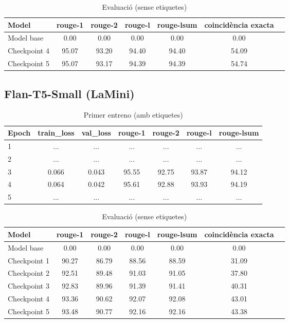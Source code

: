 \begin{table}[H]
    \caption{Evaluació (sense etiquetes)}
    \begin{tabular}{lcccccc}
    \toprule
    Model & rouge-1 & rouge-2 & rouge-l & rouge-lsum & coincidència exacta \\
    \midrule
    Model base & 0.00 & 0.00 & 0.00 & 0.00 & 0.00 \\
    Checkpoint 4 & 95.07 & 93.20 & 94.40 & 94.40 & 54.09 \\
    Checkpoint 5 & 95.07 & 93.17 & 94.39 & 94.39 & 54.74 \\
    \bottomrule
    \end{tabular}
\end{table}






\subsection{Flan-T5-Small (LaMini)}
\begin{table}[H]
    \caption{Primer entreno (amb etiquetes)}
    \begin{tabular}{lcccccc}
    \toprule
    Epoch & train\_loss & val\_loss & rouge-1 & rouge-2 & rouge-l & rouge-lsum \\
    \midrule
    1 & ... & ... & ... & ... & ... & ... \\
    2 & ... & ... & ... & ... & ... & ... \\
    3 & 0.066 & 0.043 & 95.55 & 92.75 & 93.87 & 94.12 \\
    4 & 0.064 & 0.042 & 95.61 & 92.88 & 93.93 & 94.19 \\
    5 & ... & ... & ... & ... & ... & ... \\
    \bottomrule
    \end{tabular}
\end{table}

\begin{table}[H]
    \caption{Evaluació (sense etiquetes)}
    \begin{tabular}{lcccccc}
    \toprule
    Model & rouge-1 & rouge-2 & rouge-l & rouge-lsum & coincidència exacta \\
    \midrule
    Model base & 0.00 & 0.00 & 0.00 & 0.00 & 0.00 \\
    Checkpoint 1 & 90.27 & 86.79 & 88.56 & 88.59 & 31.09 \\
    Checkpoint 2 & 92.51 & 89.48 & 91.03 & 91.05 & 37.80 \\
    Checkpoint 3 & 92.83 & 89.96 & 91.39 & 91.41 & 40.31 \\
    Checkpoint 4 & 93.36 & 90.62 & 92.07 & 92.08 & 43.01 \\
    Checkpoint 5 & 93.48 & 90.77 & 92.16 & 92.16 & 43.38 \\
    \bottomrule
    \end{tabular}
\end{table}





